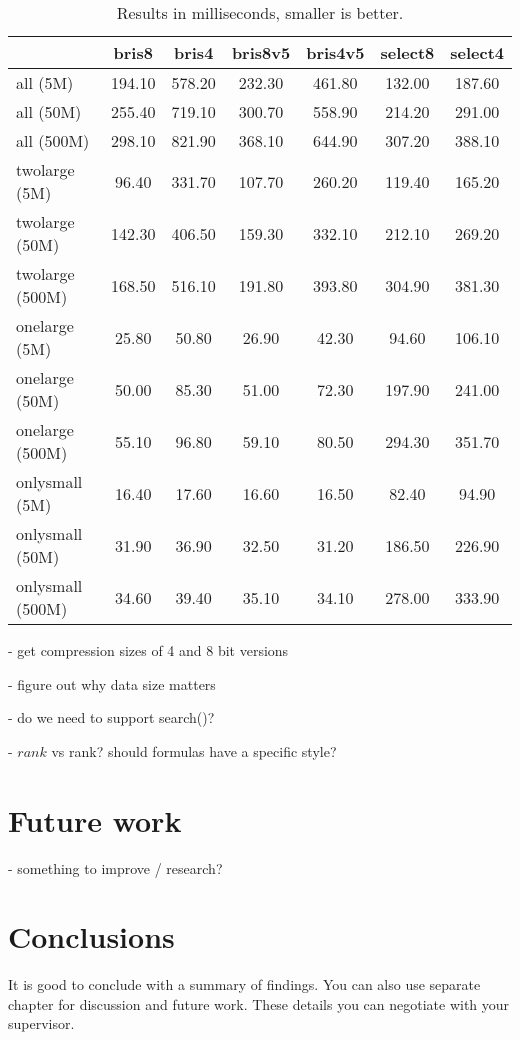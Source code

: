 \begin{table}
\centering
\caption{Results in milliseconds, smaller is better.\label{table:results1}}
\begin{tabular}{l||c c c c c c} 
& bris8 & bris4 & bris8v5 & bris4v5 & select8 & select4  \\
 \hline \hline 
all (5M)   & 194.10 & 578.20 & 232.30 & 461.80 & 132.00 & 187.60 \\
all (50M)   & 255.40 & 719.10 & 300.70 & 558.90 & 214.20 & 291.00 \\
all (500M)   & 298.10 & 821.90 & 368.10 & 644.90 & 307.20 & 388.10 \\
twolarge (5M)   & 96.40 & 331.70 & 107.70 & 260.20 & 119.40 & 165.20 \\
twolarge (50M)   & 142.30 & 406.50 & 159.30 & 332.10 & 212.10 & 269.20 \\
twolarge (500M)   & 168.50 & 516.10 & 191.80 & 393.80 & 304.90 & 381.30 \\
onelarge (5M)   & 25.80 & 50.80 & 26.90 & 42.30 & 94.60 & 106.10 \\
onelarge (50M)   & 50.00 & 85.30 & 51.00 & 72.30 & 197.90 & 241.00 \\
onelarge (500M)   & 55.10 & 96.80 & 59.10 & 80.50 & 294.30 & 351.70 \\
onlysmall (5M)   & 16.40 & 17.60 & 16.60 & 16.50 & 82.40 & 94.90 \\
onlysmall (50M)   & 31.90 & 36.90 & 32.50 & 31.20 & 186.50 & 226.90 \\
onlysmall (500M)   & 34.60 & 39.40 & 35.10 & 34.10 & 278.00 & 333.90 \\


\hline
%
\end{tabular}
\end{table}




 - get compression sizes of 4 and 8 bit versions

 - figure out why data size matters

 - do we need to support search()?

 - $rank$ vs rank? should formulas have a specific style?

\chapter{Future work}
 - something to improve / research?

\chapter{Conclusions\label{chapter:conclusions}}

It is good to conclude with a summary of findings. You can also use separate chapter for discussion and future work. These details you can negotiate with your supervisor.
